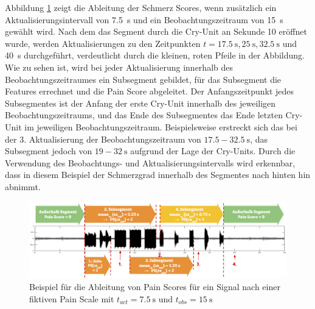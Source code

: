 Abbildung \ref{img:regression_score_example03} zeigt die Ableitung der Schmerz Scores, wenn zusätzlich ein Aktualisierungsintervall von \SI{7.5}{\second} und ein Beobachtungszeitraum von \SI{15}{\second} gewählt wird. Nach dem das Segment durch die Cry-Unit an Sekunde 10 eröffnet wurde, werden Aktualisierungen zu den Zeitpunkten $t = \SI{17.5}{\second}, \SI{25}{\second}, \SI{32.5}{\second}$ und \SI{40}{\second} durchgeführt, verdeutlicht durch die kleinen, roten Pfeile in der Abbildung. Wie zu sehen ist, wird bei jeder Aktualisierung innerhalb des Beobachtungszeitraumes ein Subsegment gebildet, für das Subsegment die Features errechnet und die Pain Score abgeleitet. Der Anfangszeitpunkt jedes Subsegmentes ist der Anfang der erste Cry-Unit innerhalb des jeweiligen Beobachtungszeitraums, und das Ende des Subsegmentes das Ende letzten Cry-Unit im jeweiligen Beobachtungszeitraum. Beispielsweise erstreckt sich das bei der 3. Aktualisierung der Beobachtungszeitraum von $17.5 - \SI{32.5}{\second}$, das Subsegment jedoch von $19 - \SI{32}{\second}$ aufgrund der Lage der Cry-Units. Durch die Verwendung des Beobachtungs- und Aktualisierungsintervalls wird erkennbar, dass in diesem Beispiel der Schmerzgrad innerhalb des Segmentes nach hinten hin abnimmt.

\begin{figure}[h]
	\centering
	\includegraphics[width=1\textwidth]{bilder/regression_score_example03.png}
	\caption{Beispiel für die Ableitung von Pain Scores für ein Signal nach einer fiktiven Pain Scale mit $t_{act} = \SI{7.5}{\second}$ und $t_{obs} = \SI{15}{\second}$}
	\label{img:regression_score_example03}
\end{figure}
